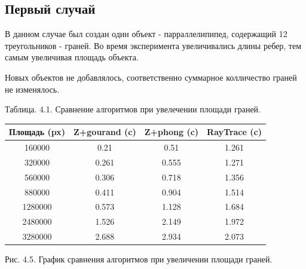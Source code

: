 \documentclass[12pt]{report}
\begin{document}
	\subsection{Первый случай}
	
	В данном случае был создан один объект - парраллелипипед, содержащий 12 треугольников - граней.
	Во время эксперимента увеличивались длины ребер, тем самым увеличивая площадь объекта.
	
	Новых объектов не добавлялось, соответственно суммарное колличество граней не изменялось.
	
	Таблица. 4.1. Сравнение алгоритмов при увелечении площади граней.
	
	\begin{center}
		\begin{tabular}{|c c c c|}
			\hline
			Площадь (px) & Z+gourand (c) & Z+phong (c) & RayTrace (c) \\ [0.5ex]
			\hline
			160000 & 0.21 & 0.51 & 1.261 \\ 
			\hline 
			320000 & 0.261 & 0.555 & 1.271 \\ 
			\hline 
			560000 & 0.306 & 0.718 & 1.356 \\ 
			\hline 
			880000 & 0.411 & 0.904 & 1.514 \\ 
			\hline 
			1280000 & 0.573 & 1.128 & 1.684 \\ 
			\hline 
			2480000 & 1.526 & 2.149 & 1.972 \\ 
			\hline 
			3280000 & 2.688 & 2.934 & 2.073 \\
			\hline
		\end{tabular}
	\end{center}

	\begin{center}
		\begin{center}
		\end{center}
		Рис. 4.5. График сравнения алгоритмов при увеличении площади граней.
	\end{center}
\end{document}
